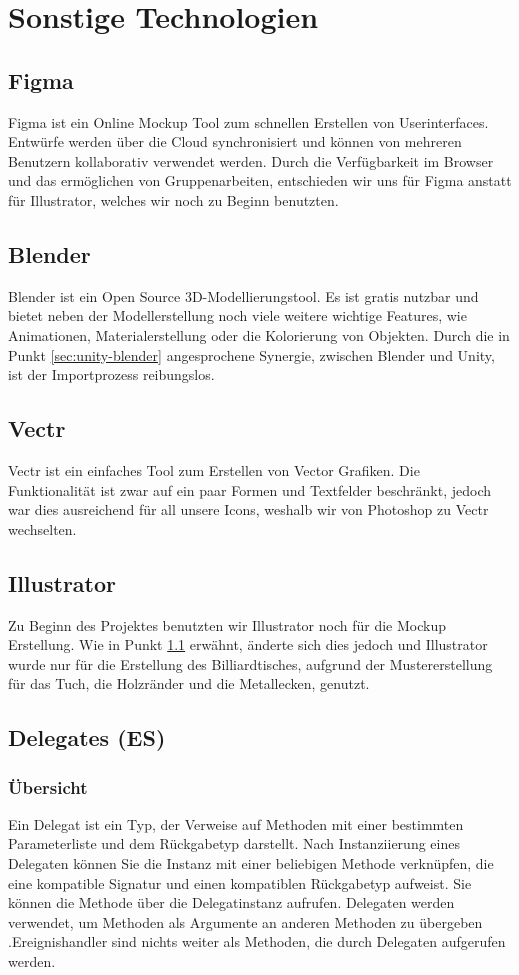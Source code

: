 \section{Sonstige Technologien}
\subsection{Figma} \label{sec:figma}
Figma ist ein Online Mockup Tool zum schnellen Erstellen von Userinterfaces. Entwürfe werden über die Cloud synchronisiert und können von mehreren Benutzern kollaborativ verwendet werden. Durch die Verfügbarkeit im Browser und das ermöglichen von Gruppenarbeiten, entschieden wir uns für Figma anstatt für Illustrator, welches wir noch zu Beginn benutzten.
\subsection{Blender} \label{Blender}
Blender ist ein Open Source 3D-Modellierungstool. Es ist gratis nutzbar und bietet neben der Modellerstellung noch viele weitere wichtige Features, wie Animationen, Materialerstellung oder die Kolorierung von Objekten. Durch die in Punkt \ref{sec:unity-blender} angesprochene Synergie, zwischen Blender und Unity, ist der Importprozess reibungslos.
\subsection{Vectr}
Vectr ist ein einfaches Tool zum Erstellen von Vector Grafiken. Die Funktionalität ist zwar auf ein paar Formen und Textfelder beschränkt, jedoch war dies ausreichend für all unsere Icons, weshalb wir von Photoshop zu Vectr wechselten.
\subsection{Illustrator}
Zu Beginn des Projektes benutzten wir Illustrator noch für die Mockup Erstellung. Wie in Punkt \ref{sec:figma} erwähnt, änderte sich dies jedoch und Illustrator wurde nur für die Erstellung des Billiardtisches, aufgrund der Mustererstellung für das Tuch, die Holzränder und die Metallecken, genutzt.
\subsection{Delegates (ES)}
\subsubsection{Übersicht}
Ein Delegat ist ein Typ, der Verweise auf Methoden mit einer bestimmten Parameterliste und dem Rückgabetyp darstellt. Nach Instanziierung eines Delegaten können Sie die Instanz mit einer beliebigen Methode verknüpfen, die eine kompatible Signatur und einen kompatiblen Rückgabetyp aufweist. Sie können die Methode über die Delegatinstanz aufrufen.
Delegaten werden verwendet, um Methoden als Argumente an anderen Methoden zu übergeben .Ereignishandler sind nichts weiter als Methoden, die durch Delegaten aufgerufen werden.
